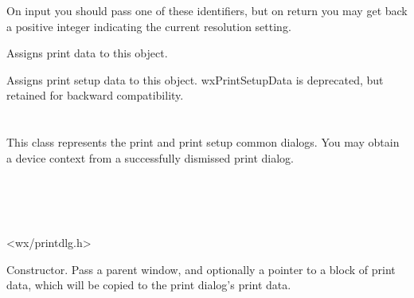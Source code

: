 On input you should pass one of these identifiers, but on return you may get back a positive integer
indicating the current resolution setting.


\label{wxprintdataassign}


Assigns print data to this object.


Assigns print setup data to this object. wxPrintSetupData is deprecated,
but retained for backward compatibility.

\section{}\label{wxprintdialog}

This class represents the print and print setup common dialogs.
You may obtain a  device context from
a successfully dismissed print dialog.


\\
\\
\\


<wx/printdlg.h>





\label{wxprintdialogctor}


Constructor. Pass a parent window, and optionally a pointer to a block of print
data, which will be copied to the print dialog's print data.




\label{wxprintdialogdtor}

